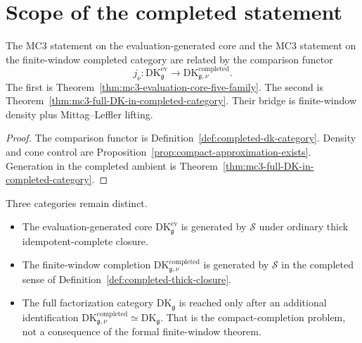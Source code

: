 \section{Scope of the completed statement}
\label{sec:comparison-gap-resolution}

\begin{corollary}
\label{cor:comparison-gap-resolved-completed}
%
The MC3 statement on the evaluation-generated core and the MC3
statement on the finite-window completed category are related by the
comparison functor
\[
 j_\nu\colon
 \mathrm{DK}^{\mathrm{ev}}_{\mathfrak g}
 \longrightarrow
 \mathrm{DK}^{\mathrm{completed}}_{\mathfrak g,\nu}.
\]
The first is Theorem~\ref{thm:mc3-evaluation-core-five-family}.  The
second is Theorem~\ref{thm:mc3-full-DK-in-completed-category}.  Their
bridge is finite-window density plus Mittag--Leffler lifting.
\end{corollary}

\begin{proof}
The comparison functor is Definition~\ref{def:completed-dk-category}.
Density and cone control are
Proposition~\ref{prop:compact-approximation-exists}.  Generation in
the completed ambient is
Theorem~\ref{thm:mc3-full-DK-in-completed-category}.
\end{proof}

\begin{remark}
\label{rem:honest-scope-statement}
%
Three categories remain distinct.
\begin{itemize}[nosep]
\item The evaluation-generated core
 $\mathrm{DK}^{\mathrm{ev}}_{\mathfrak g}$ is generated by
 $\mathcal S$ under ordinary thick idempotent-complete closure.
\item The finite-window completion
 $\mathrm{DK}^{\mathrm{completed}}_{\mathfrak g,\nu}$ is generated by
 $\mathcal S$ in the completed sense of
 Definition~\ref{def:completed-thick-closure}.
\item The full factorization category $\mathrm{DK}_{\mathfrak g}$ is
 reached only after an additional identification
 $\mathrm{DK}^{\mathrm{completed}}_{\mathfrak g,\nu}\simeq
 \mathrm{DK}_{\mathfrak g}$.  That is the compact-completion problem,
 not a consequence of the formal finite-window theorem.
\end{itemize}
\end{remark}

